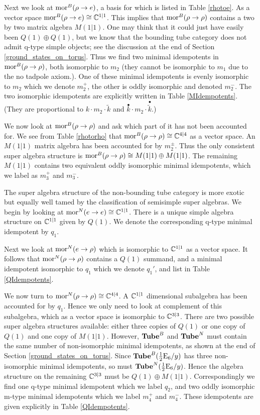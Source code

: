 Next we look at $\text{mor}^B(\rho \to e)$, 
a basis for which is listed in Table \ref{rhotoe}. 
As a vector space $\text{mor}^B(\rho \to e ) \cong \mathbb{C}^{1|1}$. 
This implies that $\text{mor}^B(\rho \to \rho)$ contains a two by two matrix algebra $M(1|1)$.
One may think that it could just have easily been $Q(1)\oplus Q(1)$, 
but we know that the bounding tube category does not admit q-type simple objects; see the discussion at the end of Section \ref{ground_states_on_torus}.
Thus we find two minimal idempotents in $\text{mor}^B(\rho \to \rho)$, both isomorphic to $m_2$ (they cannot be isomorphic to $m_1$ due to the no tadpole axiom.).
One of these minimal idempotents is evenly isomorphic to $m_2$ which we denote $m_2^+$, the other is oddly isomorphic and denoted $m_2^-$.
The two isomorphic idempotents are explicitly written in Table \ref{MIdempotents}.
(They are proportional to $k \cdot m_2\cdot  \tilde{k}$ and $\overset{\bullet}{k} \cdot m_2 \cdot \overset{\bullet}{\tilde{k}}$.)


We now look at $\text{mor}^B(\rho \to \rho)$ and ask which part of it has not been accounted for. 
We see from Table \ref{rhotorho} that $\text{mor}^B(\rho \to \rho) \cong \mathbb{C}^{4|4}$ as a vector space. 
An $M(1|1)$ matrix algebra has been accounted for by $m_2^{\pm}$. 
Thus the only consistent super algebra structure is $\text{mor}^B(\rho \to \rho) \cong M(1|1) \oplus M(1|1)$.
The remaining $M(1|1)$ contains two equivalent oddly isomorphic minimal idempotents, 
which we label as $m_3^+$ and $m_3^-$.


\medskip

The super algebra structure of the non-bounding tube category is more exotic but equally well tamed by the classification of semisimple super algebras.
We begin by looking at $\text{mor}^N(e\to e) \cong \mathbb{C}^{1|1}$. 
There is a unique simple algebra structure on $\mathbb{C}^{1|1}$ given by $Q(1)$. 
We denote the corresponding q-type minimal idempotent by $q_1$.

Next we look at $\text{mor}^N(e \to \rho)$ which is isomorphic to $\mathbb{C}^{1|1}$ as a vector space. 
It follows that $\text{mor}^N(\rho \to \rho)$ contains a $Q(1)$ summand, 
and a minimal idempotent isomorphic to $q_1$ which we denote $q_1'$, and list in Table \ref{QIdempotents}. 

We now turn to $\text{mor}^N(\rho \to \rho) \cong \mathbb{C}^{4|4}$. 
A $\mathbb{C}^{1|1}$ dimensional subalgebra has been accounted for by $q_1$. 
Hence we only need to look at complement of this subalgebra, which as a vector space is isomorphic to $\mathbb{C}^{3|3}$.
There are two possible super algebra structures available: either three copies of $Q(1)$ or one copy of $Q(1)$ and one copy of $M(1|1)$.
However, $\textbf{Tube}^B$ and $\textbf{Tube}^N$ must contain the same number of non-isomorphic minimal idempotents, 
as shown at the end of Section \ref{ground_states_on_torus}. 
Since $\textbf{Tube}^B(\frac{1}{2}\text{E}_6/y)$ has three non-isomorphic minimal idempotents, 
so must $\textbf{Tube}^N(\frac{1}{2}\text{E}_6/y)$. 
Hence the algebra structure on the remaining $\mathbb{C}^{3|3}$ must be $Q(1)\oplus M(1|1)$.
Correspondingly we find one q-type minimal idempotent which we label $q_2$, 
and two oddly isomorphic m-type minimal idempotents which we label $m_4^+$ and $m_4^-$.
These idempotents are given explicitly in Table \ref{QIdempotents}.


